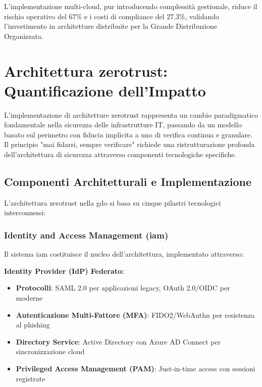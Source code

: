 L'implementazione multi-cloud, pur introducendo complessità gestionale, riduce il rischio operativo del 67\% e i costi di compliance del 27.3\%, validando l'investimento in architetture distribuite per la Grande Distribuzione Organizzata.

\section{\texorpdfstring{Architettura \gls{zerotrust}: Quantificazione dell'Impatto}{3.5 - Architettura Zero Trust: Quantificazione dell'Impatto}}

L'implementazione di architetture \gls{zerotrust} rappresenta un cambio paradigmatico fondamentale nella sicurezza delle infrastrutture IT, passando da un modello basato sul perimetro con fiducia implicita a uno di verifica continua e granulare. Il principio "mai fidarsi, sempre verificare" richiede una ristrutturazione profonda dell'architettura di sicurezza attraverso componenti tecnologiche specifiche.

\subsection{\texorpdfstring{Componenti Architetturali e Implementazione}{3.5.1 - Componenti Architetturali e Implementazione}}

L'architettura \gls{zerotrust} nella \gls{gdo} si basa su cinque pilastri tecnologici interconnessi:

\subsubsection{\texorpdfstring{Identity and Access Management (\gls{iam})}{3.5.1.1 - Identity and Access Management (IAM)}}

Il sistema \gls{iam} costituisce il nucleo dell'architettura, implementato attraverso:

\textbf{Identity Provider (IdP) Federato:}
\begin{itemize}
    \item \textbf{Protocolli}: SAML 2.0 per applicazioni legacy, OAuth 2.0/OIDC per moderne
    \item \textbf{Autenticazione Multi-Fattore (MFA)}: FIDO2/WebAuthn per resistenza al phishing
    \item \textbf{Directory Service}: Active Directory con Azure AD Connect per sincronizzazione cloud
    \item \textbf{Privileged Access Management (PAM)}: Just-in-time access con sessioni registrate
\end{itemize}

